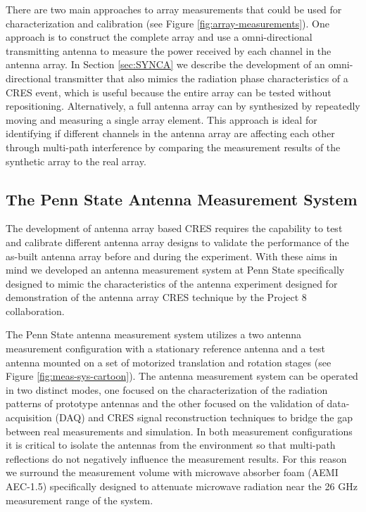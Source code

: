 There are two main approaches to array measurements that could be used for characterization and calibration (see Figure \ref{fig:array-measurements}). One approach is to construct the complete array and use a omni-directional transmitting antenna to measure the power received by each channel in the antenna array. In Section \ref{sec:SYNCA} we describe the development of an omni-directional transmitter that also mimics the radiation phase characteristics of a CRES event, which is useful because the entire array can be tested without repositioning. Alternatively, a full antenna array can by synthesized by repeatedly moving and measuring a single array element. This approach is ideal for identifying if different channels in the antenna array are affecting each other through multi-path interference by comparing the measurement results of the synthetic array to the real array. 

\subsection{The Penn State Antenna Measurement System}
\label{sec:antenna_measurement_system}

The development of antenna array based CRES requires the capability to test and calibrate different antenna array designs to validate the performance of the as-built antenna array before and during the experiment. With these aims in mind we developed an antenna measurement system at Penn State specifically designed to mimic the characteristics of the antenna experiment designed for demonstration of the antenna array CRES technique by the Project 8 collaboration. 

The Penn State antenna measurement system utilizes a two antenna measurement configuration with a stationary reference antenna and a test antenna mounted on a set of motorized translation and rotation stages (see Figure \ref{fig:meas-sys-cartoon}). The antenna measurement system can be operated in two distinct modes, one focused on the characterization of the radiation patterns of prototype antennas and the other focused on the validation of data-acquisition (DAQ) and CRES signal reconstruction techniques to bridge the gap between real measurements and simulation. In both measurement configurations it is critical to isolate the antennas from the environment so that multi-path reflections do not negatively influence the measurement results. For this reason we surround the measurement volume with microwave absorber foam (AEMI AEC-1.5) specifically designed to attenuate microwave radiation near the 26 GHz measurement range of the system.

